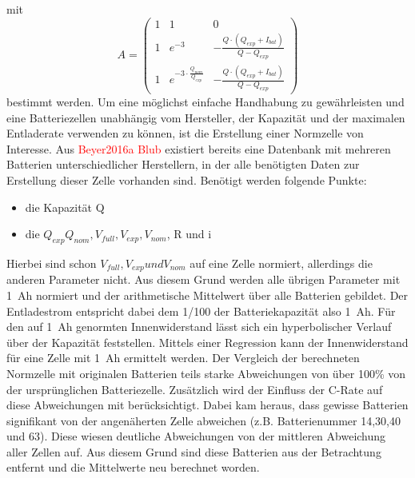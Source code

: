 mit
\begin{equation}
	A = \begin{pmatrix}
	1 & 1 & 0 \\ 1 & e^{-3} & -\frac{Q\cdot (Q_{exp}+I_{bat})}{Q-Q_{exp}} \\ 1 & e^{-3\cdot\frac{Q_{nom}}{Q_{exp}}} & -\frac{Q\cdot (Q_{exp}+I_{bat})}{Q-Q_{exp}}
	\end{pmatrix}
\end{equation}
bestimmt werden.
Um eine möglichst einfache Handhabung zu gewährleisten und eine Batteriezellen unabhängig vom Hersteller, der Kapazität und der maximalen Entladerate verwenden zu können, ist die Erstellung einer Normzelle von Interesse. Aus \textcolor{red}{Beyer2016a Blub} existiert bereits eine Datenbank mit mehreren Batterien unterschiedlicher Herstellern, in der alle benötigten Daten zur Erstellung dieser Zelle vorhanden sind. Benötigt werden folgende Punkte: 
\begin{itemize}
	\item die Kapazität Q
	\item die $Q_{exp} Q_{nom}, V_{full}, V_{exp}, V_{nom}$, R und i
\end{itemize}
Hierbei sind schon $V_{full}, V_{exp} und V_{nom}$ auf eine Zelle normiert, allerdings die anderen Parameter nicht. Aus diesem Grund werden alle übrigen Parameter mit \SI{1}{Ah} normiert und der arithmetische Mittelwert über alle Batterien gebildet. Der Entladestrom entspricht dabei dem 1/100 der Batteriekapazität also \SI{1}{Ah}. Für den auf \SI{1}{Ah} genormten Innenwiderstand lässt sich ein hyperbolischer Verlauf über der Kapazität feststellen. Mittels einer Regression kann der Innenwiderstand für eine Zelle mit \SI{1}{Ah} ermittelt werden. 
Der Vergleich der berechneten Normzelle mit originalen Batterien teils starke Abweichungen von über 100\% von der ursprünglichen Batteriezelle. Zusätzlich wird der Einfluss der C-Rate auf diese Abweichungen mit berücksichtigt. Dabei kam heraus, dass gewisse Batterien signifikant von der angenäherten Zelle abweichen (z.B. Batterienummer 14,30,40 und 63). Diese wiesen deutliche Abweichungen von der mittleren Abweichung aller Zellen auf. Aus diesem Grund sind diese Batterien aus der Betrachtung entfernt und die Mittelwerte neu berechnet worden.




